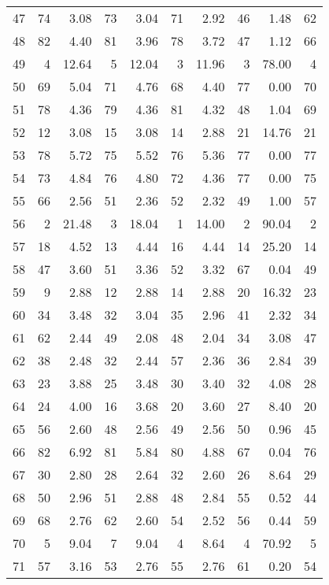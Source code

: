 \begin{table}[ht]
\begin{tabular}{rrrrrrrrrr}
  47 &  74 & 3.08 &  73 & 3.04 &  71 & 2.92 &  46 & 1.48 &  62 \\ 
  48 &  82 & 4.40 &  81 & 3.96 &  78 & 3.72 &  47 & 1.12 &  66 \\ 
  49 &   4 & 12.64 &   5 & 12.04 &   3 & 11.96 &   3 & 78.00 &   4 \\ 
  50 &  69 & 5.04 &  71 & 4.76 &  68 & 4.40 &  77 & 0.00 &  70 \\ 
  51 &  78 & 4.36 &  79 & 4.36 &  81 & 4.32 &  48 & 1.04 &  69 \\ 
  52 &  12 & 3.08 &  15 & 3.08 &  14 & 2.88 &  21 & 14.76 &  21 \\ 
  53 &  78 & 5.72 &  75 & 5.52 &  76 & 5.36 &  77 & 0.00 &  77 \\ 
  54 &  73 & 4.84 &  76 & 4.80 &  72 & 4.36 &  77 & 0.00 &  75 \\ 
  55 &  66 & 2.56 &  51 & 2.36 &  52 & 2.32 &  49 & 1.00 &  57 \\ 
  56 &   2 & 21.48 &   3 & 18.04 &   1 & 14.00 &   2 & 90.04 &   2 \\ 
  57 &  18 & 4.52 &  13 & 4.44 &  16 & 4.44 &  14 & 25.20 &  14 \\ 
  58 &  47 & 3.60 &  51 & 3.36 &  52 & 3.32 &  67 & 0.04 &  49 \\ 
  59 &   9 & 2.88 &  12 & 2.88 &  14 & 2.88 &  20 & 16.32 &  23 \\ 
  60 &  34 & 3.48 &  32 & 3.04 &  35 & 2.96 &  41 & 2.32 &  34 \\ 
  61 &  62 & 2.44 &  49 & 2.08 &  48 & 2.04 &  34 & 3.08 &  47 \\ 
  62 &  38 & 2.48 &  32 & 2.44 &  57 & 2.36 &  36 & 2.84 &  39 \\ 
  63 &  23 & 3.88 &  25 & 3.48 &  30 & 3.40 &  32 & 4.08 &  28 \\ 
  64 &  24 & 4.00 &  16 & 3.68 &  20 & 3.60 &  27 & 8.40 &  20 \\ 
  65 &  56 & 2.60 &  48 & 2.56 &  49 & 2.56 &  50 & 0.96 &  45 \\ 
  66 &  82 & 6.92 &  81 & 5.84 &  80 & 4.88 &  67 & 0.04 &  76 \\ 
  67 &  30 & 2.80 &  28 & 2.64 &  32 & 2.60 &  26 & 8.64 &  29 \\ 
  68 &  50 & 2.96 &  51 & 2.88 &  48 & 2.84 &  55 & 0.52 &  44 \\ 
  69 &  68 & 2.76 &  62 & 2.60 &  54 & 2.52 &  56 & 0.44 &  59 \\ 
  70 &   5 & 9.04 &   7 & 9.04 &   4 & 8.64 &   4 & 70.92 &   5 \\ 
  71 &  57 & 3.16 &  53 & 2.76 &  55 & 2.76 &  61 & 0.20 &  54 \\ 

\end{tabular}
\end{table}
